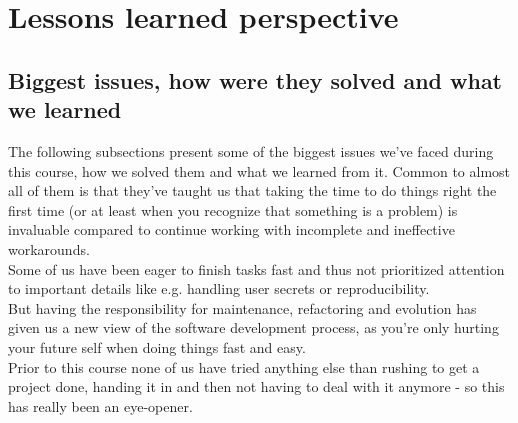 \section{Lessons learned perspective}
\subsection{Biggest issues, how were they solved and what we learned}



The following subsections present some of the biggest issues we've faced during this course, how we solved them and what we learned from it. Common to almost all of them is that they've taught us that taking the time to do things right the first time (or at least when you recognize that something is a problem) is invaluable compared to continue working with incomplete and ineffective workarounds. \\ Some of us have been eager to finish tasks fast and thus not prioritized attention to important details like e.g. handling user secrets or reproducibility. \\
But having the responsibility for maintenance, refactoring and evolution has given us a new view of the software development process, as you're only hurting your future self when doing things fast and easy. \\
Prior to this course none of us have tried anything else than rushing to get a project done, handing it in and then not having to deal with it anymore - so this has really been an eye-opener. \\

